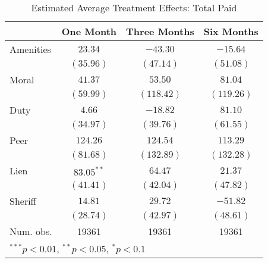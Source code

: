 \documentclass[12pt,titlepage]{article}
\begin{document}
\begin{table}[htbp]
\caption{Estimated Average Treatment Effects: Total Paid}
\begin{center}
\begin{tabular}{l c c c }
\hline
          & One Month & Three Months & Six Months \\
\hline
Amenities & $23.34$      & $-43.30$   & $-15.64$   \\
          & $(35.96)$    & $(47.14)$  & $(51.08)$  \\
Moral     & $41.37$      & $53.50$    & $81.04$    \\
          & $(59.99)$    & $(118.42)$ & $(119.26)$ \\
Duty      & $4.66$       & $-18.82$   & $81.10$    \\
          & $(34.97)$    & $(39.76)$  & $(61.55)$  \\
Peer      & $124.26$     & $124.54$   & $113.29$   \\
          & $(81.68)$    & $(132.89)$ & $(132.28)$ \\
Lien      & $83.05^{**}$ & $64.47$    & $21.37$    \\
          & $(41.41)$    & $(42.04)$  & $(47.82)$  \\
Sheriff   & $14.81$      & $29.72$    & $-51.82$   \\
          & $(28.74)$    & $(42.97)$  & $(48.61)$  \\
\hline
Num. obs. & 19361        & 19361      & 19361      \\
\hline
\multicolumn{4}{l}{\scriptsize{$^{***}p<0.01$, $^{**}p<0.05$, $^*p<0.1$}}
\end{tabular}
\label{tbl:reg7_tp}
\end{center}
\end{table}
\end{document}
